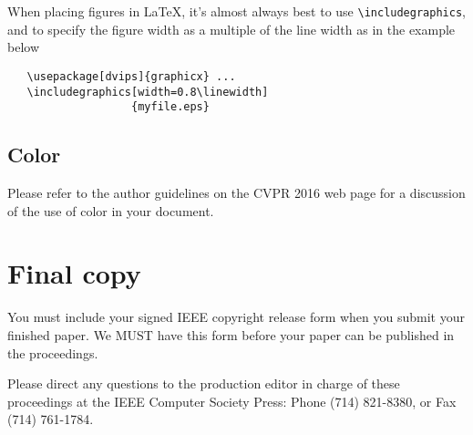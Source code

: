\documentclass[10pt,twocolumn,letterpaper]{article}
\begin{document}
When placing figures in \LaTeX, it's almost always best to use
\verb+\includegraphics+, and to specify the  figure width as a multiple of
the line width as in the example below
{\small\begin{verbatim}
   \usepackage[dvips]{graphicx} ...
   \includegraphics[width=0.8\linewidth]
                   {myfile.eps}
\end{verbatim}
}


\subsection{Color}

Please refer to the author guidelines on the CVPR 2016 web page for a discussion
of the use of color in your document.

\section{Final copy}

You must include your signed IEEE copyright release form when you submit
your finished paper. We MUST have this form before your paper can be
published in the proceedings.

Please direct any questions to the production editor in charge of these
proceedings at the IEEE Computer Society Press: Phone (714) 821-8380, or
Fax (714) 761-1784.

{\small


}
\end{document}
